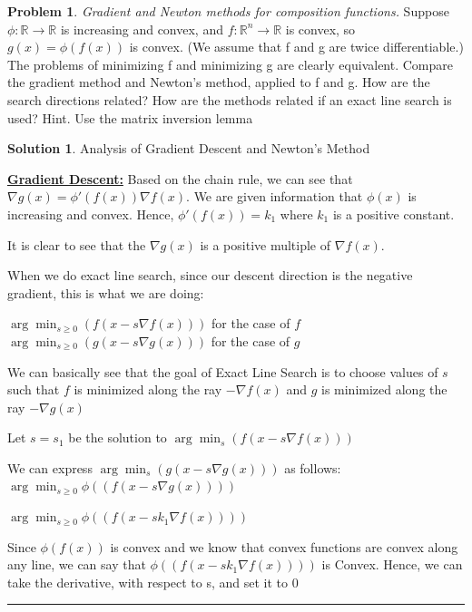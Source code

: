 \documentclass{article}
\theoremstyle{definition}
\newtheorem{problem}{Problem}
\def\fline{\rule{0.75\linewidth}{0.5pt}}
\newcommand{\finishline}{\begin{center}\fline\end{center}}
\newtheorem*{solution*}{Solution}
\newenvironment{solution}{\begin{solution*}}{{\finishline} \end{solution*}}
\begin{document}
\newpage 
\begin{problem} \textit{Gradient and Newton methods for composition functions.} Suppose $\phi: \mathbb{R} \rightarrow \mathbb{R}$ is increasing and convex, and $f: \mathbb{R}^n \rightarrow \mathbb{R}$ is convex, so $g(x) = \phi(f(x))$ is convex. (We assume that f and g are twice differentiable.) The problems of minimizing f and minimizing g are clearly equivalent. \newline 
Compare the gradient method and Newton’s method, applied to f and g. How are the
search directions related? How are the methods related if an exact line search is used?
Hint. Use the matrix inversion lemma

\begin{solution} Analysis of Gradient Descent and Newton's Method

\textbf{\underline{Gradient Descent:}} \newline 
    Based on the chain rule, we can see that $\nabla g(x) = \phi'(f(x)) \nabla f(x)$. We are given information that $\phi(x)$ is increasing and convex. Hence, $\phi'(f(x)) = k_1$ where $k_1$ is a positive constant. 
    
    It is clear to see that the $\nabla g(x)$ is a positive multiple of $\nabla f(x)$.  
    
    When we do exact line search, since our descent direction is the negative gradient, this is what we are doing:

    $\arg \min_{s \geq 0} (f(x - s\nabla f(x)))$ for the case of $f$ \newline 
    $\arg \min_{s \geq 0} (g(x - s\nabla g(x)))$ for the case of $g$ \newline 

    We can basically see that the goal of Exact Line Search is to choose values of $s$ such that $f$ is minimized along the ray $-\nabla f(x)$ and $g$ is minimized along the ray $-\nabla g(x)$

    Let $s = s_1$ be the solution to $\arg \min_{s} (f(x - s\nabla f(x)))$


    We can express $\arg \min_{s} (g(x - s\nabla g(x)))$ as follows: \newline 
    $\arg \min_{s \geq 0} \phi((f(x - s\nabla g(x))))$ 

    $\arg \min_{s \geq 0} \phi((f(x - sk_1 \nabla f(x))))$

    Since $\phi(f(x))$ is convex and we know that convex functions are convex along any line, we can say that $\phi((f(x - sk_1 \nabla f(x))))$ is Convex. Hence, we can take the derivative, with respect to s, and set it to 0


\end{solution}
\end{problem}
\end{document}
